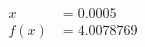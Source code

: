 \documentclass[preview]{standalone}
\begin{document}
\begin{align*}
x &= 0.0005\\f(x) &= 4.0078769
\end{align*}
\end{document}
